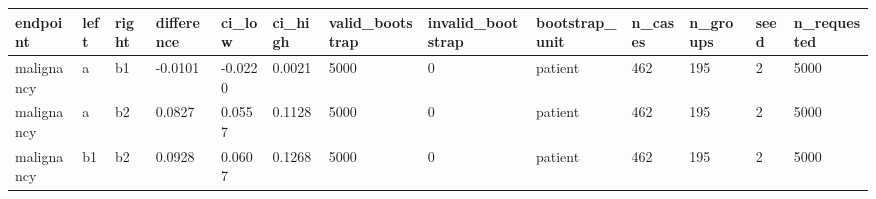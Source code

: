 \begin{tabular}{lllllllllllll}
\hline
endpoint & left & right & difference & ci\_low & ci\_high & valid\_bootstrap & invalid\_bootstrap & bootstrap\_unit & n\_cases & n\_groups & seed & n\_requested \\
\hline
malignancy & a & b1 & -0.0101 & -0.0220 & 0.0021 & 5000 & 0 & patient & 462 & 195 & 2 & 5000 \\
malignancy & a & b2 & 0.0827 & 0.0557 & 0.1128 & 5000 & 0 & patient & 462 & 195 & 2 & 5000 \\
malignancy & b1 & b2 & 0.0928 & 0.0607 & 0.1268 & 5000 & 0 & patient & 462 & 195 & 2 & 5000 \\
\hline
\end{tabular}
